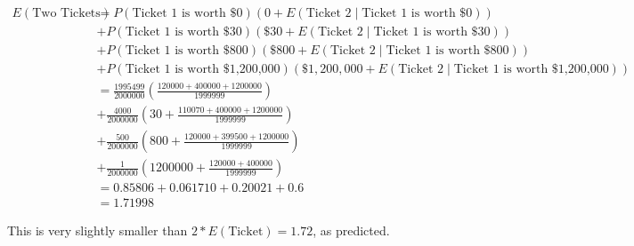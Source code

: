 \documentclass{article}
\begin{document}
\begin{align*}
E\left( \text{Two Tickets} \right)
	& =	P\left( \text{Ticket 1 is worth \$ 0} \right)
		\left( 0 
			+ E\left( \text{Ticket 2} \mid \text{Ticket 1 is worth \$0} \right)\right)\\
	&	+ P\left( \text{Ticket 1 is worth \$ 30} \right)
		\left( \$30 
			+ E\left( \text{Ticket 2} \mid \text{Ticket 1 is worth \$30} \right)\right)\\
	&	+ P\left( \text{Ticket 1 is worth \$ 800} \right)
		\left( \$800
			+ E\left( \text{Ticket 2} \mid \text{Ticket 1 is worth \$800} \right)\right)\\
	&	+ P\left( \text{Ticket 1 is worth \$ 1,200,000} \right)
		\left( \$1,200,000
			+ E\left( \text{Ticket 2} \mid \text{Ticket 1 is worth \$1,200,000} \right)
		\right)\\
	& = \frac{1995499}{2000000} 
		\left( \frac{120000 + 400000 + 1200000}{1999999} \right)\\
	& + \frac{4000}{2000000} 
		\left( 30 + \frac{110070 + 400000 + 1200000}{1999999} \right)\\
	& + \frac{500}{2000000} 
		\left( 800 + \frac{120000 + 399500 + 1200000}{1999999} \right)\\
	& + \frac{1}{2000000} 
		\left( 1200000 + \frac{120000 + 400000}{1999999} \right)\\
	& = 0.85806 + 0.061710 + 0.20021 + 0.6 \\
	& = 1.71998
\end{align*}

This is very slightly smaller than $2 * E\left( \text{Ticket} \right) = 1.72$,
	as predicted.

%	
\end{document}
